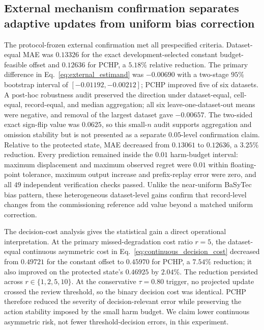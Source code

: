 \documentclass[preprint,12pt]{elsarticle}
\begin{document}
\subsection{External mechanism confirmation separates adaptive updates from uniform bias correction}

The protocol-frozen external confirmation met all prespecified criteria. Dataset-equal MAE was $0.13326$ for the exact development-selected constant budget-feasible offset and $0.12636$ for PCHP, a $5.18\%$ relative reduction. The primary difference in Eq.~\eqref{eq:external_estimand} was $-0.00690$ with a two-stage $95\%$ bootstrap interval of $[-0.01192,-0.00212]$; PCHP improved five of six datasets. A post-hoc robustness audit preserved the direction under dataset-equal, cell-equal, record-equal, and median aggregation; all six leave-one-dataset-out means were negative, and removal of the largest dataset gave $-0.00657$. The two-sided exact sign-flip value was $0.0625$, so this small-$n$ audit supports aggregation and omission stability but is not presented as a separate $0.05$-level confirmation claim. Relative to the protected state, MAE decreased from $0.13061$ to $0.12636$, a $3.25\%$ reduction. Every prediction remained inside the $0.01$ harm-budget interval: maximum displacement and maximum observed regret were $0.01$ within floating-point tolerance, maximum output increase and prefix-replay error were zero, and all $49$ independent verification checks passed. Unlike the near-uniform BaSyTec bias pattern, these heterogeneous dataset-level gains confirm that record-level changes from the commissioning reference add value beyond a matched uniform correction.

The decision-cost analysis gives the statistical gain a direct operational interpretation. At the primary missed-degradation cost ratio $r=5$, the dataset-equal continuous asymmetric cost in Eq.~\eqref{eq:continuous_decision_cost} decreased from $0.49721$ for the constant offset to $0.45970$ for PCHP, a $7.54\%$ reduction; it also improved on the protected state's $0.46925$ by $2.04\%$. The reduction persisted across $r\in\{1,2,5,10\}$. At the conservative $\tau=0.80$ trigger, no projected update crossed the review threshold, so the binary decision cost was identical. PCHP therefore reduced the severity of decision-relevant error while preserving the action stability imposed by the small harm budget. We claim lower continuous asymmetric risk, not fewer threshold-decision errors, in this experiment.
\end{document}
